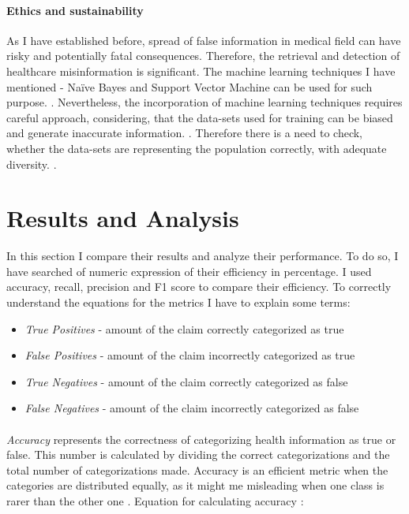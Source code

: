 \documentclass[11pt ,english,a4paper]{article}
\begin{document}
\paragraph{Ethics and sustainability}%
As I have established before, spread of false information in medical field can have risky and potentially fatal consequences. Therefore, the retrieval and detection of healthcare misinformation is significant. The machine learning techniques I have mentioned - Naïve Bayes and Support Vector Machine can be used for such purpose. \cite{chap22unmask}. Nevertheless, the incorporation of machine learning techniques requires careful approach, considering, that the data-sets used for training can be biased and generate inaccurate information. \cite{who21ethics}. Therefore there is a need to check, whether the data-sets are representing the population correctly, with adequate diversity. \cite{sch23aut}.

\section{Results and Analysis}\label{analysis}
In this section I compare their results and analyze their performance. To do so, I have searched of numeric expression of their efficiency in percentage. I used accuracy, recall, precision and F1 score to compare their efficiency. To correctly understand the equations for the metrics I have to explain some terms:

\begin{itemize}
\item \emph{True Positives} - amount of the claim correctly categorized as true
\item \emph{False Positives} - amount of the claim incorrectly categorized as true
\item \emph{True Negatives} - amount of the claim correctly categorized as false
\item \emph{False Negatives} - amount of the claim incorrectly categorized as false
\end{itemize}

\paragraph{} \emph{Accuracy} represents the correctness of categorizing health information as true or false. This number is calculated by dividing the correct categorizations and the total number of categorizations made. Accuracy is an efficient metric when the categories are distributed equally, as it might me misleading when one class is rarer than the other one \cite{aph18detect}. Equation for calculating accuracy \cite{sha20mach}:
\end{document}
